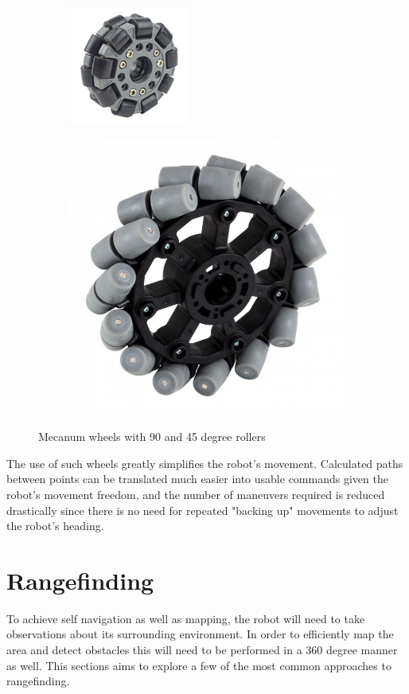 			\begin{figure}[h]
				\centering
				\begin{subfigure}{.5\textwidth}
					\centering
					\includegraphics[width=.4\linewidth]{ANALYSIS/90degwheel.png}
				\end{subfigure}
				\begin{subfigure}{.5\textwidth}
					\centering
					\includegraphics[width=.4\linewidth]{ANALYSIS/45degwheel.jpg}
				\end{subfigure}
				\caption{Mecanum wheels with 90 and 45 degree rollers}
				\label{fig:omnidirectionalwheels}
			\end{figure}
		
			The use of such wheels greatly simplifies the robot's movement. Calculated paths between points can be translated much easier into usable commands given the robot's movement freedom, and the number of maneuvers required is reduced drastically since there is no need for repeated "backing up" movements to adjust the robot's heading.
			
			\section{Rangefinding}
			To achieve self navigation as well as mapping, the robot will need to take observations about its surrounding environment. In order to efficiently map the area and detect obstacles this will need to be performed in a 360 degree manner as well. This sections aims to explore a few of the most common approaches to rangefinding.
			
